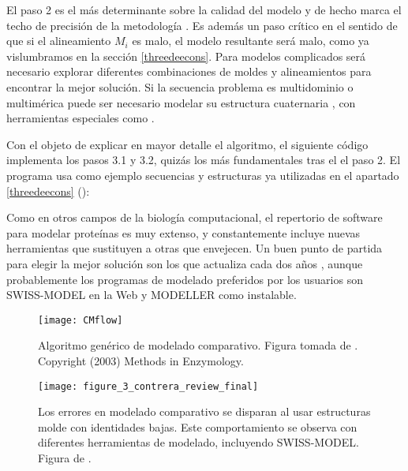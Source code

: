 El paso 2 es el m\'{a}s determinante sobre la calidad del modelo y de hecho marca el techo de precisi\'{o}n de la metodolog\'{i}a 
\citep{ContrerasMoreira2005}. Es adem\'{a}s un paso cr\'{i}tico en el sentido de que si el alineamiento $M_{i}$ es malo, 
el modelo resultante ser\'{a} malo, como ya vislumbramos en la secci\'{o}n \ref{threedeecons}. Para modelos complicados ser\'{a} 
necesario explorar diferentes combinaciones de moldes y alineamientos para encontrar la mejor soluci\'{o}n. %
Si la secuencia problema es multidominio o multim\'{e}rica puede ser necesario modelar su estructura cuaternaria \citep{Tramontano2017}, 
con herramientas especiales como
. 

Con el objeto de explicar en mayor detalle el algoritmo, el siguiente c\'{o}digo implementa los pasos 3.1 y 3.2, quiz\'{a}s
los m\'{a}s fundamentales tras el el paso 2. El programa usa como ejemplo secuencias
y estructuras ya utilizadas en el apartado \ref{threedeecons} ():


Como en otros campos de la biolog\'{i}a computacional, el repertorio de software para modelar prote\'{i}nas es muy extenso,
y constantemente incluye nuevas herramientas que sustituyen a otras que envejecen.
Un buen punto de partida para elegir la mejor soluci\'{o}n son los  que actualiza cada dos a\~nos 
, aunque probablemente los 
programas de modelado preferidos por los usuarios son SWISS-MODEL en la Web y MODELLER como instalable.

\begin{figure}
\begin{center} 
\texttt{[image: CMflow]}
\caption%
{
Algoritmo gen\'{e}rico de modelado comparativo.
Figura tomada de \citet{Fiser2003}. Copyright (2003) Methods in Enzymology.
}
\label{fig:CMflow}
\end{center}
\end{figure}

\begin{figure}
\begin{center} 
\texttt{[image: figure\_3\_contrera\_review\_final]}
\caption%
{
Los errores en modelado comparativo se disparan al usar estructuras molde con identidades bajas.
Este comportamiento se observa con diferentes herramientas de modelado, incluyendo SWISS-MODEL.
Figura de \citet{Contreras-Moreira2002b}. 
}
\label{fig:CMbench}
\end{center}
\end{figure}

